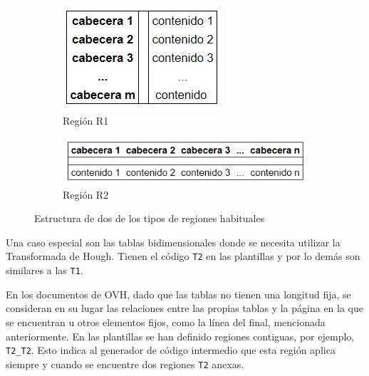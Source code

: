 \begin{figure}
    \centering
    \begin{subfigure}[b]{0.34\textwidth}
        \centering
        \includegraphics[width=\textwidth]{imaxes/g-analisis/region-r1}
        \caption{Región R1}
        \label{fig:region-r1}
    \end{subfigure}
    \hfill
    \begin{subfigure}[b]{0.65\textwidth}
        \centering
        \includegraphics[width=\textwidth]{imaxes/g-analisis/region-r2}
        \caption{Región R2}
        \label{fig:region-r2}
    \end{subfigure}
    \caption{Estructura de dos de los tipos de regiones habituales}
    \label{fig:tipos-de-regiones}
\end{figure}

Una caso especial son las tablas bidimensionales donde se necesita utilizar la Transformada de Hough. Tienen el código \verb|T2| en las plantillas y por lo demás son similares a las \verb|T1|.

En los documentos de OVH, dado que las tablas no tienen una longitud fija, se consideran en su lugar las relaciones entre las propias tablas y la página en la que se encuentran u otros elementos fijos, como la línea del final, mencionada anteriormente. En las plantillas se han definido regiones contiguas, por ejemplo, \verb|T2_T2|. Esto indica al generador de código intermedio que esta región aplica siempre y cuando se encuentre dos regiones \verb|T2| anexas.


